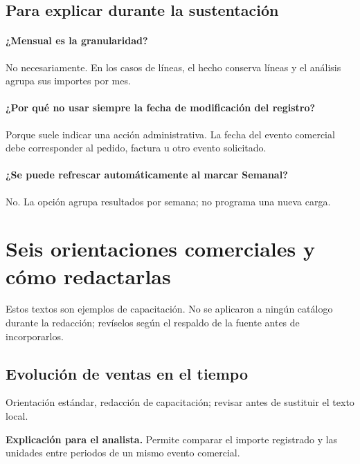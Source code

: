 \subsection{Para explicar durante la sustentación}
\paragraph{¿Mensual es la granularidad?} No necesariamente. En los casos de líneas, el hecho conserva líneas y el análisis agrupa sus importes por mes.

\paragraph{¿Por qué no usar siempre la fecha de modificación del registro?} Porque suele indicar una acción administrativa. La fecha del evento comercial debe corresponder al pedido, factura u otro evento solicitado.

\paragraph{¿Se puede refrescar automáticamente al marcar Semanal?} No. La opción agrupa resultados por semana; no programa una nueva carga.

\endgroup
{}

\section{Seis orientaciones comerciales y cómo redactarlas}
Estos textos son ejemplos de capacitación. No se aplicaron a ningún catálogo durante la redacción; revíselos según el respaldo de la fuente antes de incorporarlos.

\subsection{Evolución de ventas en el tiempo}
Orientación estándar, redacción de capacitación; revisar antes de sustituir el texto local.

\textbf{Explicación para el analista.} Permite comparar el importe registrado y las unidades entre periodos de un mismo evento comercial.

